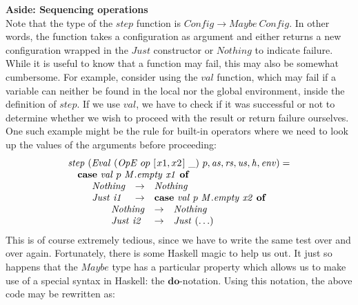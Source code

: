 \documentclass[10pt,a4paper]{exam} %
\begin{document}
\begin{questions}
\begin{mdframed}
\textbf{Aside: Sequencing operations}\\
Note that the type of the $\mathit{step}$ function is $\mathit{Config} \to \mathit{Maybe}~\mathit{Config}$. In other words, the function takes a configuration as argument and either returns a new configuration wrapped in the $\mathit{Just}$ constructor or $\mathit{Nothing}$ to indicate failure. While it is useful to know that a function may fail, this may also be somewhat cumbersome. For example, consider using the $\mathit{val}$ function, which may fail if a variable can neither be found in the local nor the global environment, inside the definition of $\mathit{step}$. If we use $\mathit{val}$, we have to check if it was successful or not to determine whether we wish to proceed with the result or return failure ourselves. One such example might be the rule for built-in operators where we need to look up the values of the arguments before proceeding:
\begin{displaymath}
\begin{array}{l}
\mathit{step}~(\mathit{Eval}~(\mathit{OpE}~op~[\mskip1.5mu x1,x2 \mskip1.5mu]~\_)~p,\mathit{as},\mathit{rs},\mathit{us},\mathit{h},\mathit{env}) = \\
\quad \mathbf{case}~\mathit{val}~p~\mathit{M.empty}~\mathit{x1}~\mathbf{of} \\
\qquad \begin{array}{lcl}
\mathit{Nothing} & \to & \mathit{Nothing} \\
\mathit{Just~i1} & \to & \mathbf{case}~\mathit{val}~p~\mathit{M.empty}~\mathit{x2}~\mathbf{of}
\end{array} \\
\qquad \qquad \begin{array}{lcl}
\mathit{Nothing} & \to & \mathit{Nothing} \\
\mathit{Just~i2} & \to & \mathit{Just}~(\ldots)
\end{array}
\end{array}
\end{displaymath}
This is of course extremely tedious, since we have to write the same test over and over again. Fortunately, there is some Haskell magic to help us out. It just so happens that the $\mathit{Maybe}$ type has a particular property which allows us to make use of a special syntax in Haskell: the $\mathbf{do}$-notation. Using this notation, the above code may be rewritten as:
\begin{displaymath}
\begin{array}{l}

\end{array}
\end{displaymath}
\end{mdframed}
\end{questions}
\end{document}
